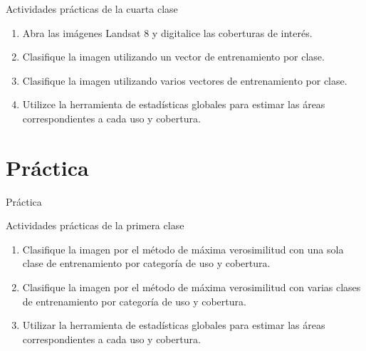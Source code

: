 \documentclass[]{beamer}
\begin{document}
\begin{frame}{\secname}
  \begin{exampleblock}{Actividades prácticas de la cuarta clase}
    \begin{enumerate}[<+>]
      \item Abra las imágenes Landsat 8 y digitalice las coberturas de interés.
      \item Clasifique la imagen utilizando un vector de entrenamiento por clase.
      \item Clasifique la imagen utilizando varios vectores de entrenamiento por clase.
      \item Utilizce la herramienta de estadísticas globales para estimar las áreas correspondientes a cada uso y cobertura.
    \end{enumerate}
  \end{exampleblock}
\end{frame}
\section{Práctica}

\begin{frame}{Práctica}
  \begin{exampleblock}{Actividades prácticas de la primera clase}
    \begin{enumerate}
      \item Clasifique la imagen por el método de máxima verosimilitud con una sola clase de entrenamiento por categoría de uso y cobertura.
      \item Clasifique la imagen por el método de máxima verosimilitud con varias clases de entrenamiento por categoría de uso y cobertura.
      \item Utilizar la herramienta de estadísticas globales para estimar las áreas correspondientes a cada uso y cobertura.
    \end{enumerate}
  \end{exampleblock}
\end{frame}
\end{document}
